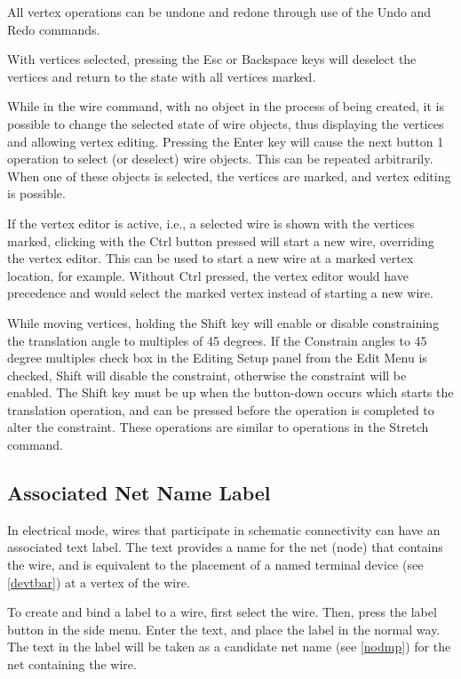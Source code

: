 All vertex operations can be undone and redone through use of the {\cb
Undo} and {\cb Redo} commands.

With vertices selected, pressing the {\kb Esc} or {\kb Backspace} keys
will deselect the vertices and return to the state with all vertices
marked.

While in the {\cb wire} command, with no object in the process of
being created, it is possible to change the selected state of wire
objects, thus displaying the vertices and allowing vertex editing. 
Pressing the {\kb Enter} key will cause the next button 1 operation to
select (or deselect) wire objects.  This can be repeated arbitrarily. 
When one of these objects is selected, the vertices are marked, and
vertex editing is possible.

If the vertex editor is active, i.e., a selected wire is shown with
the vertices marked, clicking with the {\cb Ctrl} button pressed will
start a new wire, overriding the vertex editor.  This can be used to
start a new wire at a marked vertex location, for example.  Without
{\cb Ctrl} pressed, the vertex editor would have precedence and would
select the marked vertex instead of starting a new wire.

While moving vertices, holding the {\kb Shift} key will enable or
disable constraining the translation angle to multiples of 45 degrees. 
If the {\cb Constrain angles to 45 degree multiples} check box in the
{\cb Editing Setup} panel from the {\cb Edit Menu} is checked, {\kb
Shift} will disable the constraint, otherwise the constraint will be
enabled.  The {\kb Shift} key must be up when the button-down occurs
which starts the translation operation, and can be pressed before the
operation is completed to alter the constraint.  These operations are
similar to operations in the {\cb Stretch} command.

\subsection{Associated Net Name Label}

In electrical mode, wires that participate in schematic connectivity
can have an associated text label.  The text provides a name for the
net (node) that contains the wire, and is equivalent to the placement
of a named terminal device (see \ref{devtbar}) at a vertex of the
wire.

To create and bind a label to a wire, first select the wire.  Then,
press the {\cb label} button in the side menu.  Enter the text, and
place the label in the normal way.  The text in the label will be
taken as a candidate net name (see \ref{nodmp}) for the net containing
the wire.

